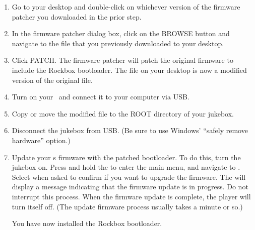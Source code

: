 \begin{enumerate}
{    built without Unicode support.}
  \item Go to your desktop and double-click on whichever version of the firmware 
  patcher you downloaded in the prior step.
  \item In the firmware patcher dialog box, click on the BROWSE button and navigate
  to the  file that you previously downloaded to your desktop.
  \item Click PATCH. The firmware patcher will patch the original firmware to 
  include the Rockbox bootloader. The  file on your desktop is now
  a modified version of the original  file.
  \item Turn on your \playername\ and connect it to your computer via USB.
  \item Copy or move the modified  file to the ROOT directory of 
    your jukebox.
  \item Disconnect the jukebox from USB. (Be sure to use Windows' ``safely remove
  hardware'' option.)
  \item Update your \playername s firmware with the patched bootloader. To do this, turn 
    the jukebox on. Press and hold the 
    to enter the main menu, and navigate to . Select  when asked to confirm if you want to upgrade the 
    firmware. The \playername{} will display a message indicating that the
    firmware update 
    is in progress. Do not interrupt this process. When the firmware update is 
    complete, the player will turn itself off. (The update firmware process usually 
    takes a minute or so.)

    You have now installed the Rockbox bootloader. 


\end{enumerate}
